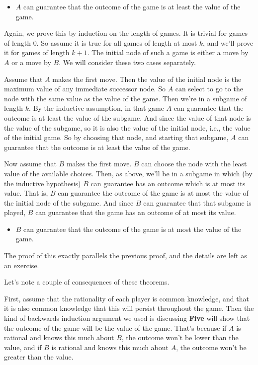 \documentclass[
  11pt,
  letterpaper,
]{scrbook}
\providecommand{\tightlist}{%
  \setlength{\itemsep}{0pt}\setlength{\parskip}{0pt}}
\begin{document}
\begin{itemize}
\tightlist
\item
  \(A\) can guarantee that the outcome of the game is at least the value
  of the game.
\end{itemize}

Again, we prove this by induction on the length of games. It is trivial
for games of length 0. So assume it is true for all games of length at
most \(k\), and we'll prove it for games of length \(k+1\). The initial
node of such a game is either a move by \(A\) or a move by \(B\). We
will consider these two cases separately.

Assume that \(A\) makes the first move. Then the value of the initial
node is the maximum value of any immediate successor node. So \(A\) can
select to go to the node with the same value as the value of the game.
Then we're in a subgame of length \(k\). By the inductive assumption, in
that game \(A\) can guarantee that the outcome is at least the value of
the subgame. And since the value of that node is the value of the
subgame, so it is also the value of the initial node, i.e., the value of
the initial game. So by choosing that node, and starting that subgame,
\(A\) can guarantee that the outcome is at least the value of the game.

Now assume that \(B\) makes the first move. \(B\) can choose the node
with the least value of the available choices. Then, as above, we'll be
in a subgame in which (by the inductive hypothesis) \(B\) can guarantee
has an outcome which is at most its value. That is, \(B\) can guarantee
the outcome of the game is at most the value of the initial node of the
subgame. And since \(B\) can guarantee that that subgame is played,
\(B\) can guarantee that the game has an outcome of at most its value.

\begin{itemize}
\tightlist
\item
  \(B\) can guarantee that the outcome of the game is at most the value
  of the game.
\end{itemize}

The proof of this exactly parallels the previous proof, and the details
are left as an exercise.

Let's note a couple of consequences of these theorems.

First, assume that the rationality of each player is common knowledge,
and that it is also common knowledge that this will persist throughout
the game. Then the kind of backwards induction argument we used is
discussing \textbf{Five} will show that the outcome of the game will be
the value of the game. That's because if \(A\) is rational and knows
this much about \(B\), the outcome won't be lower than the value, and if
\(B\) is rational and knows this much about \(A\), the outcome won't be
greater than the value.
\end{document}
